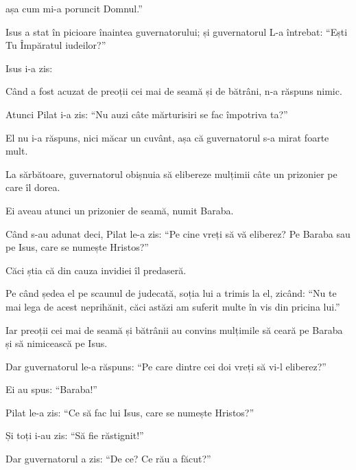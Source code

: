 {\par }{\QB așa cum mi-a poruncit Domnul.”


\par }{\PP {}Isus a stat în picioare înaintea guvernatorului; și guvernatorul L-a întrebat: “Ești Tu Împăratul iudeilor?”

\par }{\PP Isus i-a zis:
{}


\par }{\PP {}Când a fost acuzat de preoții cei mai de seamă și de bătrâni, n-a răspuns nimic.

Atunci Pilat i-a zis: “Nu auzi câte mărturisiri se fac împotriva ta?”


\par }{\PP {}El nu i-a răspuns, nici măcar un cuvânt, așa că guvernatorul s-a mirat foarte mult.


\par }{\PP {}La sărbătoare, guvernatorul obișnuia să elibereze mulțimii câte un prizonier pe care îl dorea.

Ei aveau atunci un prizonier de seamă, numit Baraba.

Când s-au adunat deci, Pilat le-a zis: “Pe cine vreți să vă eliberez? Pe Baraba sau pe Isus, care se numește Hristos?”

Căci știa că din cauza invidiei îl predaseră.


\par }{\PP {}Pe când ședea el pe scaunul de judecată, soția lui a trimis la el, zicând: “Nu te mai lega de acest neprihănit, căci astăzi am suferit multe în vis din pricina lui.”


\par }{\PP {}Iar preoții cei mai de seamă și bătrânii au convins mulțimile să ceară pe Baraba și să nimicească pe Isus.

Dar guvernatorul le-a răspuns: “Pe care dintre cei doi vreți să vi-l eliberez?”

\par }{\PP Ei au spus: “Baraba!”


\par }{\PP {}Pilat le-a zis: “Ce să fac lui Isus, care se numește Hristos?”

\par }{\PP Și toți i-au zis: “Să fie răstignit!”


\par }{\PP {}Dar guvernatorul a zis: “De ce? Ce rău a făcut?”

}
